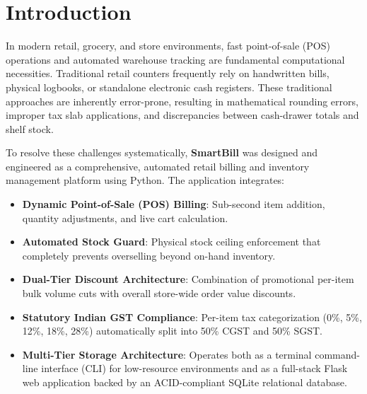 \documentclass[12pt,a4paper]{article}
\begin{document}
\newpage
\tableofcontents
\newpage

\section{Introduction}
In modern retail, grocery, and store environments, fast point-of-sale (POS) operations and automated warehouse tracking are fundamental computational necessities. Traditional retail counters frequently rely on handwritten bills, physical logbooks, or standalone electronic cash registers. These traditional approaches are inherently error-prone, resulting in mathematical rounding errors, improper tax slab applications, and discrepancies between cash-drawer totals and shelf stock.

To resolve these challenges systematically, \textbf{SmartBill} was designed and engineered as a comprehensive, automated retail billing and inventory management platform using Python. The application integrates:
\begin{itemize}
    \item \textbf{Dynamic Point-of-Sale (POS) Billing}: Sub-second item addition, quantity adjustments, and live cart calculation.
    \item \textbf{Automated Stock Guard}: Physical stock ceiling enforcement that completely prevents overselling beyond on-hand inventory.
    \item \textbf{Dual-Tier Discount Architecture}: Combination of promotional per-item bulk volume cuts with overall store-wide order value discounts.
    \item \textbf{Statutory Indian GST Compliance}: Per-item tax categorization (0\%, 5\%, 12\%, 18\%, 28\%) automatically split into 50\% CGST and 50\% SGST.
    \item \textbf{Multi-Tier Storage Architecture}: Operates both as a terminal command-line interface (CLI) for low-resource environments and as a full-stack Flask web application backed by an ACID-compliant SQLite relational database.
\end{itemize}

\end{document}
